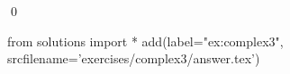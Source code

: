 
\begin{ex} 
  \label{ex:complex3}
  
  \qed
\end{ex} 
\begin{python0}
from solutions import *
add(label="ex:complex3",
    srcfilename='exercises/complex3/answer.tex') 
\end{python0}
